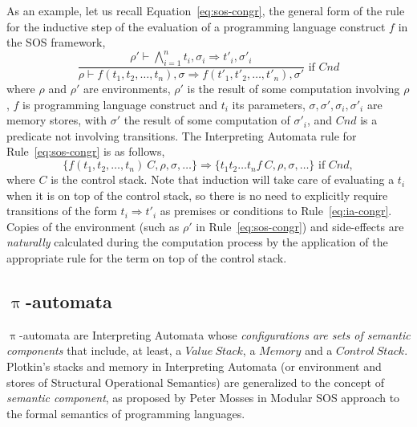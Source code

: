 \documentclass{llncs}%
\begin{document}
As an example, let us recall Equation~\ref{eq:sos-congr}, the general form of the rule for 
the inductive step of the evaluation of a programming language
construct $f$ in the SOS framework, 
\begin{equation}
\frac{\rho' \vdash \bigwedge^n_{i=1} t_i, \sigma_i \Rightarrow t'_i, \sigma'_i}
     {\rho \vdash f(t_1, t_2, \ldots, t_n), \sigma
       \Rightarrow f(t'_1, t'_2, \ldots, t'_n), \sigma'} \mbox{ if } \mathit{Cnd} \nonumber
\end{equation}
where $\rho$ and $\rho'$ are environments, $\rho'$ is the result of
some computation involving $\rho$, $f$ is programming language
construct and $t_i$ its parameters,
$\sigma, \sigma', \sigma_i, \sigma'_i$ are memory stores, with
$\sigma'$ the result of some computation of $\sigma'_i$, and
$\mathit{Cnd}$ is a predicate not involving transitions.
%
The Interpreting Automata rule for Rule~\ref{eq:sos-congr} is as follows,
\begin{equation}\label{eq:ia-congr}
\{f(t_1, t_2, \ldots, t_n)~ C, \rho, \sigma, \ldots\} \Rightarrow
\{t_1 t_2 \ldots t_n f ~ C, \rho, \sigma, \ldots\} \mbox{ if } \mathit{Cnd},
\end{equation}
where $C$ is the control stack. Note that induction will take care of
evaluating a $t_i$ when it is on top of the control stack, so there is
no need to explicitly require transitions of the form $t_i \Rightarrow
t'_i$ as premises or conditions to Rule~\ref{eq:ia-congr}. Copies of
the environment (such as $\rho'$ in Rule~\ref{eq:sos-congr}) and
side-effects are \emph{naturally} calculated during the computation
process by the application of the appropriate rule for the term on top
of the control stack.

\subsection{$\uppi$-automata}

$\uppi$-automata are Interpreting Automata
whose \emph{configurations are sets of semantic components} that include, at least, 
a $\mathit{Value~Stack}$, a $\mathit{Memory}$ and a $\mathit{Control~Stack}$.
Plotkin's stacks and memory in
Interpreting Automata (or environment and stores of Structural
Operational Semantics) are generalized to the concept of \emph{semantic
  component}, as proposed by Peter Mosses in Modular
SOS approach to the formal semantics of
programming languages.
\end{document}
